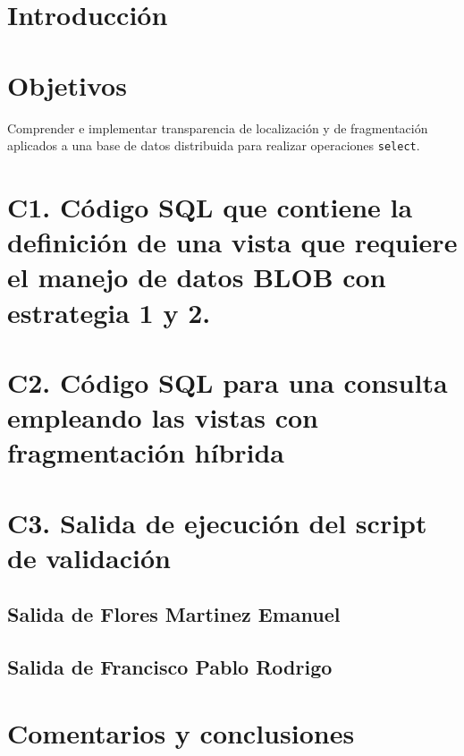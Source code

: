 \documentclass{article}
\begin{document}
\newpage

\section*{Introducción}

\section*{Objetivos}

Comprender e implementar transparencia de localización y de fragmentación 
aplicados a una base de datos distribuida para realizar operaciones
\texttt{select}.

\section*{C1. Código SQL que contiene la definición de una vista que requiere 
  el manejo de datos BLOB con estrategia 1 y 2.}

\section*{C2. Código SQL para una consulta empleando las vistas con 
  fragmentación híbrida }

\section*{C3. Salida de ejecución del script de validación}

\subsection*{Salida de Flores Martinez Emanuel}




\subsection*{Salida de Francisco Pablo Rodrigo}




\section*{Comentarios y conclusiones}
\end{document}
